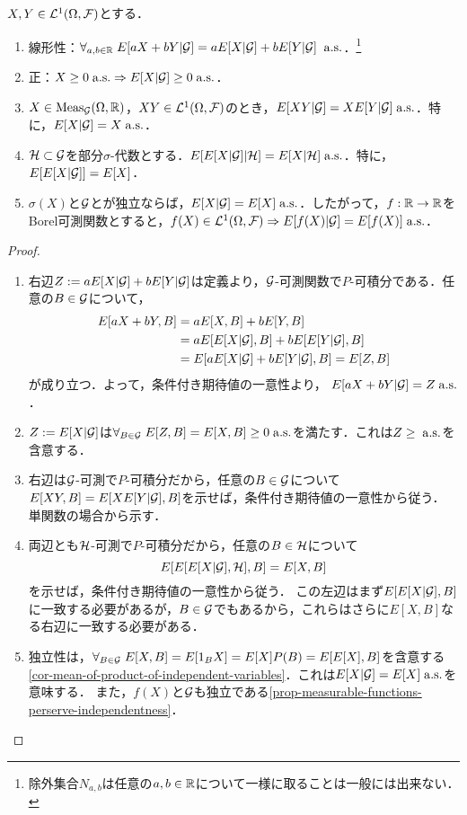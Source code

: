 \documentclass[uplatex,dvipdfmx]{jsreport}
\begin{document}
\begin{lemma}
    $X,Y\in\mathcal{L}^1(\Omega,\mathcal{F})$とする．
    \begin{enumerate}
        \item 線形性：$\forall_{a,b\in\mathbb{R}}\;E[aX+bY|\mathcal{G}]=aE[X|\mathcal{G}]+bE[Y|\mathcal{G}]\;\;\mathrm{a.s.}$．\footnote{除外集合$N_{a,b}$は任意の$a,b\in\mathbb{R}$について一様に取ることは一般には出来ない．}
        \item 正：$X\ge0\;\mathrm{a.s.}\Rightarrow E[X|\mathcal{G}]\ge0\;\mathrm{a.s.}$．
        \item $X\in\mathrm{Meas}_{\mathcal{G}}(\Omega,\mathbb{R})$，$XY\in\mathcal{L}^1(\Omega,\mathcal{F})$のとき，$E[XY|\mathcal{G}]=XE[Y|\mathcal{G}]\;\mathrm{a.s.}$．特に，$E[X|\mathcal{G}]=X\;\mathrm{a.s.}$．
        \item $\mathcal{H}\subset\mathcal{G}$を部分$\sigma$-代数とする．$E[E[X|\mathcal{G}]|\mathcal{H}]=E[X|\mathcal{H}]\;\mathrm{a.s.}$．特に，$E[E[X|\mathcal{G}]]=E[X]$．
        \item $\sigma(X)$と$\mathcal{G}$とが独立ならば，$E[X|\mathcal{G}]=E[X]\;\mathrm{a.s.}$．したがって，$f:\mathbb{R}\to\mathbb{R}$をBorel可測関数とすると，$f(X)\in\mathcal{L}^1(\Omega,\mathcal{F})\Rightarrow E[f(X)|\mathcal{G}]=E[f(X)]\;\mathrm{a.s.}$．
    \end{enumerate}
\end{lemma}
\begin{proof}\mbox{}
    \begin{enumerate}
        \item 右辺$Z:=aE[X|\mathcal{G}]+bE[Y|\mathcal{G}]$は定義より，$\mathcal{G}$-可測関数で$P$-可積分である．任意の$B\in\mathcal{G}$について，
        \begin{align*}
            E[aX+bY,B]&=aE[X,B]+bE[Y,B]\\
            &=aE[E[X|\mathcal{G}],B]+bE[E[Y|\mathcal{G}],B]\\
            &=E[aE[X|\mathcal{G}]+bE[Y|\mathcal{G}],B]=E[Z,B]
        \end{align*}
        が成り立つ．よって，条件付き期待値の一意性より，
        $E[aX+bY|\mathcal{G}]=Z\;\mathrm{a.s.}$．
        \item $Z:=E[X|\mathcal{G}]$は$\forall_{B\in\mathcal{G}}\;E[Z,B]=E[X,B]\ge0\;\mathrm{a.s.}$を満たす．これは$Z\ge\;\mathrm{a.s.}$を含意する．
        \item 右辺は$\mathcal{G}$-可測で$P$-可積分だから，任意の$B\in\mathcal{G}$について$E[XY,B]=E[XE[Y|\mathcal{G}],B]$を示せば，条件付き期待値の一意性から従う．
        単関数の場合から示す．
        \item 両辺とも$\mathcal{H}$-可測で$P$-可積分だから，任意の$B\in\mathcal{H}$について
        \[E[E[E[X|\mathcal{G}],\mathcal{H}],B]=E[X,B]\]
        を示せば，条件付き期待値の一意性から従う．
        この左辺はまず$E[E[X|\mathcal{G}],B]$に一致する必要があるが，$B\in\mathcal{G}$でもあるから，これらはさらに$E[X,B]$なる右辺に一致する必要がある．
        \item 独立性は，$\forall_{B\in\mathcal{G}}\;E[X,B]=E[1_BX]=E[X]P(B)=E[E[X],B]$を含意する\ref{cor-mean-of-product-of-independent-variables}．これは$E[X|\mathcal{G}]=E[X]\;\mathrm{a.s.}$を意味する．
        また，$f(X)$と$\mathcal{G}$も独立である\ref{prop-measurable-functions-perserve-independentness}．
    \end{enumerate}
\end{proof}
\end{document}
